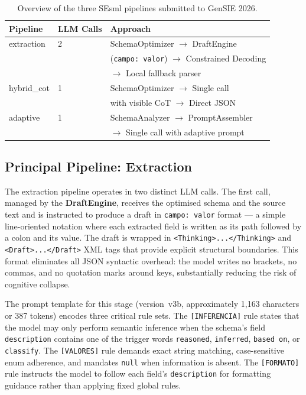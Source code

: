\documentclass[onecolumn]{ceurart}
\begin{document}
\begin{table}[h]
\centering
\caption{Overview of the three SEsml pipelines submitted to GenSIE 2026.}
\label{tab:pipelines}
\begin{tabular}{lll}
\toprule
\textbf{Pipeline} & \textbf{LLM Calls} & \textbf{Approach} \\
\midrule
extraction & 2 & SchemaOptimizer $\rightarrow$ DraftEngine \\
           &   & (\texttt{campo: valor}) $\rightarrow$ Constrained Decoding \\
           &   & $\rightarrow$ Local fallback parser \\
\addlinespace
hybrid\_cot & 1 & SchemaOptimizer $\rightarrow$ Single call \\
            &   & with visible CoT $\rightarrow$ Direct JSON \\
\addlinespace
adaptive    & 1 & SchemaAnalyzer $\rightarrow$ PromptAssembler \\
            &   & $\rightarrow$ Single call with adaptive prompt \\
\bottomrule
\end{tabular}
\end{table}

\subsection{Principal Pipeline: Extraction}

The extraction pipeline operates in two distinct LLM calls. The first call,
managed by the \textbf{DraftEngine}, receives the optimised schema and the
source text and is instructed to produce a draft in \texttt{campo: valor}
format --- a simple line-oriented notation where each extracted field is written
as its path followed by a colon and its value. The draft is wrapped in
\texttt{<Thinking>...</Thinking>} and \texttt{<Draft>...</Draft>} XML tags that
provide explicit structural boundaries. This format eliminates all JSON
syntactic overhead: the model writes no brackets, no commas, and no quotation
marks around keys, substantially reducing the risk of cognitive collapse.

The prompt template for this stage (version~v3b, approximately 1,163 characters
or 387 tokens) encodes three critical rule sets. The \texttt{[INFERENCIA]} rule
states that the model may only perform semantic inference when the schema's
field \texttt{description} contains one of the trigger words \texttt{reasoned},
\texttt{inferred}, \texttt{based on}, or \texttt{classify}. The
\texttt{[VALORES]} rule demands exact string matching, case-sensitive enum
adherence, and mandates \texttt{null} when information is absent. The
\texttt{[FORMATO]} rule instructs the model to follow each field's
\texttt{description} for formatting guidance rather than applying fixed global
rules.
\end{document}

